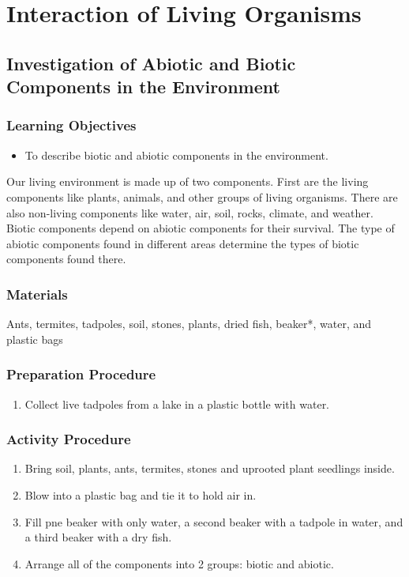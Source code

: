 \section{Interaction of Living Organisms}

\subsection{Investigation of Abiotic and Biotic Components in the Environment}

\subsubsection*{Learning Objectives}
\begin{itemize}
\item{To describe biotic and abiotic components in the environment.}
\end{itemize}


Our living environment is made up of two components. First are the living components like plants, animals, and other groups of living organisms. There are also non-living components like water, air, soil, rocks, climate, and weather. Biotic components depend on abiotic components for their survival. The type of abiotic components found in different areas determine the types of biotic components found there.

\subsubsection*{Materials}
Ants, termites, tadpoles, soil, stones, plants, dried fish, beaker*, water, and plastic bags

\subsubsection*{Preparation Procedure}
\begin{enumerate}
\item{Collect live tadpoles from a lake in a plastic bottle with water.}
\end{enumerate}

\subsubsection*{Activity Procedure}
\begin{enumerate}
\item{Bring soil, plants, ants, termites, stones and uprooted plant seedlings inside.}
\item{Blow into a plastic bag and tie it to hold air in.}
\item{Fill pne beaker with only water, a second beaker with a tadpole in water, and a third beaker with a dry fish.}
\item{Arrange all of the components into 2 groups: biotic and abiotic.}
\end{enumerate}

